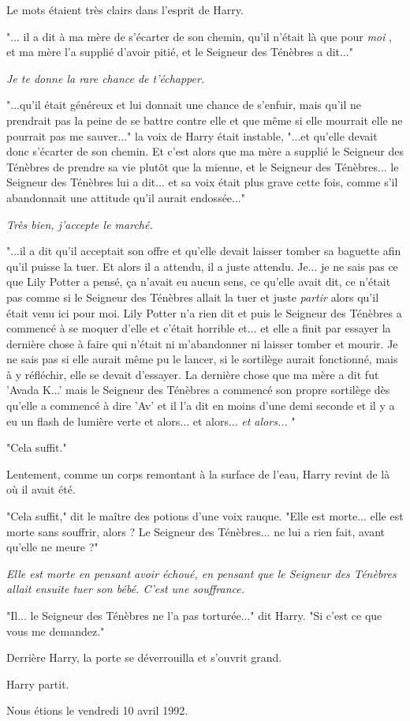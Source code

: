 Le mots étaient très clairs dans l'esprit de Harry.

"... il a dit à ma mère de s'écarter de son chemin, qu'il n'était là que pour \emph{moi} , et ma mère l'a supplié d'avoir pitié, et le Seigneur des Ténèbres a dit..."

\emph{Je te donne la rare chance de t'échapper.} 

"...qu'il était généreux et lui donnait une chance de s'enfuir, mais qu'il ne prendrait pas la peine de se battre contre elle et que même si elle mourrait elle ne pourrait pas me sauver..." la voix de Harry était instable, "...et qu'elle devait donc s'écarter de son chemin. Et c'est alors que ma mère a supplié le Seigneur des Ténèbres de prendre sa vie plutôt que la mienne, et le Seigneur des Ténèbres... le Seigneur des Ténèbres lui a dit... et sa voix était plus grave cette fois, comme s'il abandonnait une attitude qu'il aurait endossée..."

\emph{Très bien, j'accepte le marché.} 

"...il a dit qu'il acceptait son offre et qu'elle devait laisser tomber sa baguette afin qu'il puisse la tuer. Et alors il a attendu, il a juste attendu. Je... je ne sais pas ce que Lily Potter a pensé, ça n'avait eu aucun sens, ce qu'elle avait dit, ce n'était pas comme si le Seigneur des Ténèbres allait la tuer et juste \emph{partir } alors qu'il était venu ici pour moi. Lily Potter n'a rien dit et puis le Seigneur des Ténèbres a commencé à se moquer d'elle et c'était horrible et... et elle a finit par essayer la dernière chose à faire qui n'était ni m'abandonner ni laisser tomber et mourir. Je ne sais pas si elle aurait même pu le lancer, si le sortilège aurait fonctionné, mais à y réfléchir, elle se devait d'essayer. La dernière chose que ma mère a dit fut 'Avada K...' mais le Seigneur des Ténèbres a commencé son propre sortilège dès qu'elle a commencé à dire 'Av' et il l'a dit en moins d'une demi seconde et il y a eu un flash de lumière verte et alors... et alors...\emph{ et alors...} "

"Cela suffit."

Lentement, comme un corps remontant à la surface de l'eau, Harry revint de là où il avait été.

"Cela suffit," dit le maître des potions d'une voix rauque. "Elle est morte... elle est morte sans souffrir, alors ? Le Seigneur des Ténèbres... ne lui a rien fait, avant qu'elle ne meure ?"

\emph{Elle est morte en pensant avoir échoué, en pensant que le Seigneur des Ténèbres allait ensuite tuer son bébé. C'est une souffrance.} 

"Il... le Seigneur des Ténèbres ne l'a pas torturée..." dit Harry. "Si c'est ce que vous me demandez."

Derrière Harry, la porte se déverrouilla et s'ouvrit grand.

Harry partit.

Nous étions le vendredi 10 avril 1992.

